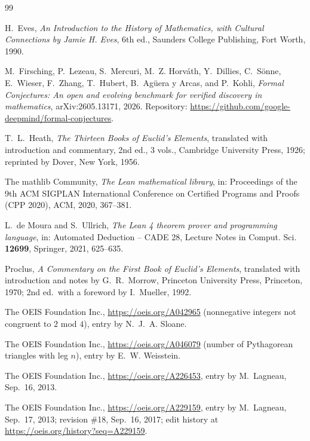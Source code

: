 \documentclass[11pt]{amsart}
\theoremstyle{plain}
\theoremstyle{definition}
\begin{document}
{\small
\begin{thebibliography}{99}

H.~Eves, \emph{An Introduction to the History of Mathematics, with Cultural Connections by Jamie H. Eves}, 6th ed., Saunders College Publishing, Fort Worth, 1990.

M.~Firsching, P.~Lezeau, S.~Mercuri, M.~Z. Horv\'ath, Y.~Dillies, C.~S\"onne, E.~Wieser, F.~Zhang, T.~Hubert, B.~Ag\"uera y Arcas, and P.~Kohli, \emph{Formal Conjectures: An open and evolving benchmark for verified discovery in mathematics}, arXiv:2605.13171, 2026. Repository: \url{https://github.com/google-deepmind/formal-conjectures}.

T.~L.~Heath, \emph{The Thirteen Books of Euclid's Elements}, translated with introduction and commentary, 2nd ed., 3 vols., Cambridge University Press, 1926; reprinted by Dover, New York, 1956.

The mathlib Community, \emph{The Lean mathematical library}, in: Proceedings of the 9th ACM SIGPLAN International Conference on Certified Programs and Proofs (CPP 2020), ACM, 2020, 367--381.

L.~de Moura and S.~Ullrich, \emph{The Lean 4 theorem prover and programming language}, in: Automated Deduction -- CADE 28, Lecture Notes in Comput. Sci. \textbf{12699}, Springer, 2021, 625--635.

Proclus, \emph{A Commentary on the First Book of Euclid's Elements}, translated with introduction and notes by G.~R.~Morrow, Princeton University Press, Princeton, 1970; 2nd ed.\ with a foreword by I.~Mueller, 1992.

The OEIS Foundation Inc., \url{https://oeis.org/A042965} (nonnegative integers not congruent to $2$ mod $4$), entry by N.~J.~A. Sloane.

The OEIS Foundation Inc., \url{https://oeis.org/A046079} (number of Pythagorean triangles with leg $n$), entry by E.~W. Weisstein.

The OEIS Foundation Inc., \url{https://oeis.org/A226453}, entry by M.~Lagneau, Sep.~16, 2013.

The OEIS Foundation Inc., \url{https://oeis.org/A229159}, entry by M.~Lagneau, Sep.~17, 2013; revision \#18, Sep.~16, 2017; edit history at \url{https://oeis.org/history?seq=A229159}.

\end{thebibliography}
}
\end{document}
